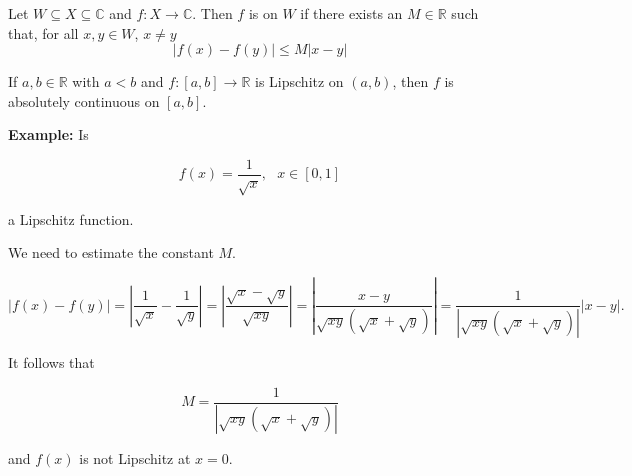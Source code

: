 \documentclass[12pt]{article}
\newcommand{\C}{\mathbb{C}}
\newcommand{\R}{\mathbb{R}}
\begin{document}
Let $W \subseteq X \subseteq \C$ and $f\colon X\to\C$.  Then $f$ is \emph{} on $W$ if there exists an $M\in\R$ such that, for all $x,y\in W$, $x \neq y$
$$|f(x)-f(y)|\leq M|x-y|$$

If $a,b\in\R$ with $a<b$ and $f\colon [a,b]\to\R$ is Lipschitz on $(a,b)$, then $f$ is absolutely continuous on $[a,b]$.

\textbf{Example:} Is   

$$f(x) = \frac{1}{\sqrt{x}},~~~x \in [0,1]$$

a Lipschitz function.

We need to estimate the constant $M$. 

$$|f(x) - f(y)| = \left|\frac{1}{\sqrt{x}} - \frac{1}{\sqrt{y}} \right| = \left|\frac{\sqrt{x} - \sqrt{y}}{\sqrt{xy}} \right| = \left|\frac{x - y}{\sqrt{xy} (\sqrt{x} + \sqrt{y})} \right| = \frac{1}{|\sqrt{xy} (\sqrt{x} + \sqrt{y})|} |x-y|.$$

 
It follows that

$$ M = \frac{1}{|\sqrt{xy} (\sqrt{x} + \sqrt{y})|} $$

and $f(x)$ is not Lipschitz at $x=0$.

\end{document}
